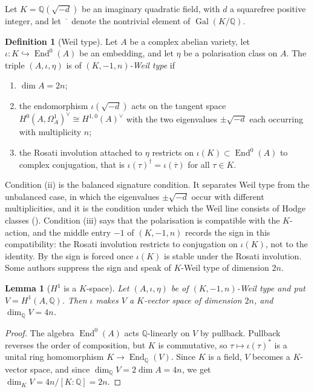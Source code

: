 \documentclass[11pt,reqno]{amsart}
\theoremstyle{plain}
\newtheorem{lemma}[theorem]{Lemma}
\theoremstyle{definition}
\newtheorem{definition}[theorem]{Definition}
\theoremstyle{remark}
\newcommand{\QQ}{\mathbb{Q}}
\DeclareMathOperator{\End}{End}
\DeclareMathOperator{\Gal}{Gal}
\newcommand{\bbar}[1]{\overline{#1}}
\begin{document}
Let $K=\QQ(\sqrt{-d})$ be an imaginary quadratic field, with $d$ a squarefree
positive integer, and let $\bbar{\phantom{x}}$ denote the nontrivial element
of $\Gal(K/\QQ)$.

\begin{definition}[Weil type]\label{def:weiltype}
Let $A$ be a complex abelian variety, let
$\iota\colon K\hookrightarrow\End^{0}(A)$ be an embedding, and let $\eta$ be a
polarisation class on $A$. The triple $(A,\iota,\eta)$ is of
\emph{$(K,-1,n)$-Weil type} if
\begin{enumerate}[label=\textup{(\roman*)},nosep]
\item $\dim A=2n$;
\item the endomorphism $\iota(\sqrt{-d})$ acts on the tangent space
  $H^{0}(A,\Omega^{1}_{A})^{\vee}\cong H^{1,0}(A)^{\vee}$ with the two
  eigenvalues $\pm\sqrt{-d}$ each occurring with multiplicity $n$;
\item the Rosati involution attached to $\eta$ restricts on
  $\iota(K)\subset\End^{0}(A)$ to complex conjugation, that is
  $\iota(\tau)^{\dagger}=\iota(\bbar{\tau})$ for all $\tau\in K$.
\end{enumerate}
\end{definition}

Condition (ii) is the balanced signature condition. It separates Weil type
from the unbalanced case, in which the eigenvalues $\pm\sqrt{-d}$ occur with
different multiplicities, and it is the condition under which the Weil line
consists of Hodge classes (). Condition (iii) says that
the polarisation is compatible with the $K$-action, and the middle entry $-1$
of $(K,-1,n)$ records the sign in this compatibility: the Rosati involution
restricts to conjugation on $\iota(K)$, not to the identity. By
 the sign is forced once $\iota(K)$ is stable under the
Rosati involution. Some authors suppress the sign and speak of $K$-Weil type
of dimension $2n$.

\begin{lemma}[$H^{1}$ is a $K$-space]\label{lem:Kspace}
Let $(A,\iota,\eta)$ be of $(K,-1,n)$-Weil type and put $V=H^{1}(A,\QQ)$. Then
$\iota$ makes $V$ a $K$-vector space of dimension $2n$, and
$\dim_{\QQ}V=4n$.
\end{lemma}

\begin{proof}
The algebra $\End^{0}(A)$ acts $\QQ$-linearly on $V$ by pullback. Pullback
reverses the order of composition, but $K$ is commutative, so
$\tau\mapsto\iota(\tau)^{*}$ is a unital ring homomorphism
$K\to\End_{\QQ}(V)$. Since $K$ is a field, $V$ becomes a $K$-vector space,
and since $\dim_{\QQ}V=2\dim A=4n$, we get $\dim_{K}V=4n/[K:\QQ]=2n$.
\end{proof}
\end{document}
